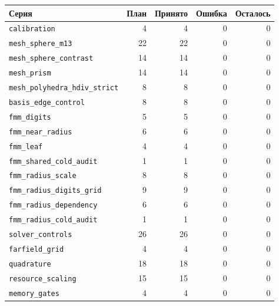 \begin{tabular}{lrrrr}
\toprule
Серия & План & Принято & Ошибка & Осталось\\
\midrule
\texttt{calibration} & 4 & 4 & 0 & 0\\
\texttt{mesh\_sphere\_m13} & 22 & 22 & 0 & 0\\
\texttt{mesh\_sphere\_contrast} & 14 & 14 & 0 & 0\\
\texttt{mesh\_prism} & 14 & 14 & 0 & 0\\
\texttt{mesh\_polyhedra\_hdiv\_strict} & 8 & 8 & 0 & 0\\
\texttt{basis\_edge\_control} & 8 & 8 & 0 & 0\\
\texttt{fmm\_digits} & 5 & 5 & 0 & 0\\
\texttt{fmm\_near\_radius} & 6 & 6 & 0 & 0\\
\texttt{fmm\_leaf} & 4 & 4 & 0 & 0\\
\texttt{fmm\_shared\_cold\_audit} & 1 & 1 & 0 & 0\\
\texttt{fmm\_radius\_scale} & 8 & 8 & 0 & 0\\
\texttt{fmm\_radius\_digits\_grid} & 9 & 9 & 0 & 0\\
\texttt{fmm\_radius\_dependency} & 6 & 6 & 0 & 0\\
\texttt{fmm\_radius\_cold\_audit} & 1 & 1 & 0 & 0\\
\texttt{solver\_controls} & 26 & 26 & 0 & 0\\
\texttt{farfield\_grid} & 4 & 4 & 0 & 0\\
\texttt{quadrature} & 18 & 18 & 0 & 0\\
\texttt{resource\_scaling} & 15 & 15 & 0 & 0\\
\texttt{memory\_gates} & 4 & 4 & 0 & 0\\
\bottomrule
\end{tabular}

